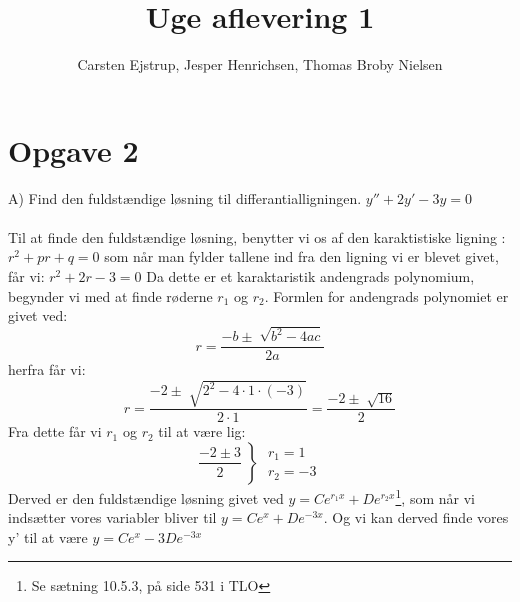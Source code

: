 \documentclass[a4paper]{article}
\title{Uge aflevering 1}
\author{Carsten Ejstrup, Jesper Henrichsen, Thomas Broby Nielsen}
\begin{document}
\maketitle

\tableofcontents
\pagebreak
\section{Opgave 2}
\indent A) Find den fuldstændige løsning til differantialligningen. 
$y'' + 2y' - 3y = 0$
\\
\\
Til at finde den fuldstændige løsning, benytter vi os af den karaktistiske ligning :
$r^2 + pr + q = 0$
som når man fylder tallene ind fra den ligning vi er blevet givet, får vi: 
$r^2 + 2r - 3 = 0$
Da dette er et karaktaristik andengrads polynomium, begynder vi med at finde røderne $r_1$ og $r_2$. Formlen for andengrads polynomiet er givet ved:
$$r = \frac{-b \pm \sqrt[]{b^2-4ac}}{2a}$$
herfra får vi:
$$r = \frac{-2 \pm \sqrt[]{2^2-4\cdot 1 \cdot (-3)}}{2\cdot 1} = \frac{-2 \pm \sqrt[]{16}}{2}$$
Fra dette får vi $r_1$ og $r_2$ til at være lig: 
$$
\frac{-2 \pm 3}{2}\left\}\begin{array}{l}
r_1 = 1 \\
r_2 = -3
\end{array}\right.
$$
Derved er den fuldstændige løsning givet ved $y = Ce^{r_1x} + De^{r_2x}$\footnote{Se sætning 10.5.3, på side 531 i TLO}, som når vi indsætter vores variabler bliver til $y = Ce^{x}+De^{-3x}$. Og vi kan derved finde vores y' til at være $y = Ce^{x}-3De^{-3x}$
\end{document}
